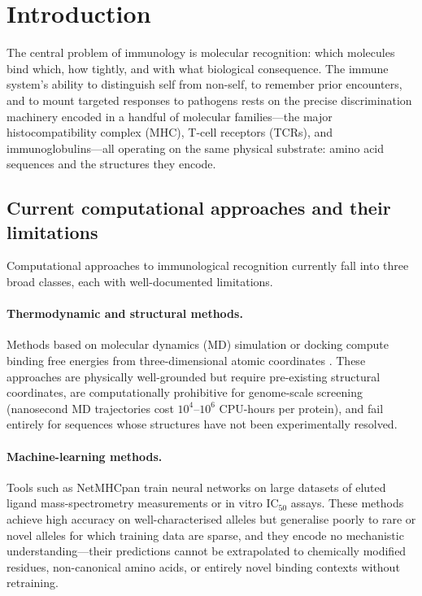 \date{\today}





\bigskip

\section{Introduction}
\label{im:sec:introduction}

The central problem of immunology is molecular recognition: which molecules bind
which, how tightly, and with what biological consequence. The immune system's
ability to distinguish self from non-self, to remember prior encounters, and to
mount targeted responses to pathogens rests on the precise discrimination
machinery encoded in a handful of molecular families---the major
histocompatibility complex (MHC), T-cell receptors (TCRs), and
immunoglobulins---all operating on the same physical substrate: amino acid
sequences and the structures they encode.

\subsection{Current computational approaches and their limitations}

Computational approaches to immunological recognition currently fall into three
broad classes, each with well-documented limitations.

\paragraph{Thermodynamic and structural methods.}
Methods based on molecular dynamics (MD) simulation or docking compute binding
free energies from three-dimensional atomic coordinates
\citep{bjorkman1987,neefjes2011}. These approaches are physically well-grounded
but require pre-existing structural coordinates, are computationally prohibitive
for genome-scale screening (nanosecond MD trajectories cost $10^4$--$10^6$
CPU-hours per protein), and fail entirely for sequences whose structures have
not been experimentally resolved.

\paragraph{Machine-learning methods.}
Tools such as NetMHCpan \citep{nielsen2007} train neural networks on large
datasets of eluted ligand mass-spectrometry measurements or in vitro
$\text{IC}_{50}$ assays. These methods achieve high accuracy on
well-characterised alleles but generalise poorly to rare or novel alleles for
which training data are sparse, and they encode no mechanistic
understanding---their predictions cannot be extrapolated to chemically modified
residues, non-canonical amino acids, or entirely novel binding contexts without
retraining.


